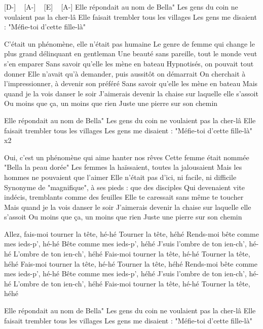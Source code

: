 [D-] ~ [A-] ~ [E] ~ [A-]
Elle répondait au nom de Bella"
Les gens du coin ne voulaient pas la cher-lâ
Elle faisait trembler tous les villages
Les gens me disaient : "Méfie-toi d'cette fille-là" 

C'était un phénomène, elle n'était pas humaine
Le genre de femme qui change le plus grand délinquant en gentleman
Une beauté sans pareille, tout le monde veut s'en emparer
Sans savoir qu'elle les mène en bateau
Hypnotisés, on pouvait tout donner
Elle n'avait qu'à demander, puis aussitôt on démarrait
On cherchait à l'impressionner, à devenir son préféré
Sans savoir qu'elle les mène en bateau
Mais quand je la vois danser le soir
J'aimerais devenir la chaise sur laquelle elle s’assoit
Ou moins que ça, un moins que rien
Juste une pierre sur son chemin

Elle répondait au nom de Bella"
Les gens du coin ne voulaient pas la cher-lâ
Elle faisait trembler tous les villages
Les gens me disaient : "Méfie-toi d'cette fille-là" x2

Oui, c'est un phénomène qui aime hanter nos rêves
Cette femme était nommée "Bella la peau dorée"
Les femmes la haïssaient, toutes la jalousaient
Mais les hommes ne pouvaient que l'aimer
Elle n'était pas d'ici, ni facile, ni difficile
Synonyme de "magnifique", à ses pieds : que des disciples
Qui devenaient vite indécis, tremblants comme des feuilles
Elle te caressait sans même te toucher
Mais quand je la vois danser le soir
J'aimerais devenir la chaise sur laquelle elle s’assoit
Ou moins que ça, un moins que rien
Juste une pierre sur son chemin

Allez, fais-moi tourner la tête, hé-hé
Tourner la tête, héhé
Rends-moi bête comme mes ieds-p', hé-hé
Bête comme mes ieds-p', héhé
J'suis l'ombre de ton ien-ch', hé-hé
L'ombre de ton ien-ch', héhé
Fais-moi tourner la tête, hé-hé
Tourner la tête, héhé
Fais-moi tourner la tête, hé-hé
Tourner la tête, héhé
Rends-moi bête comme mes ieds-p', hé-hé
Bête comme mes ieds-p', héhé
J'suis l'ombre de ton ien-ch', hé-hé
L'ombre de ton ien-ch', héhé
Fais-moi tourner la tête, hé-hé
Tourner la tête, héhé

Elle répondait au nom de Bella"
Les gens du coin ne voulaient pas la cher-lâ
Elle faisait trembler tous les villages
Les gens me disaient : "Méfie-toi d'cette fille-là" 